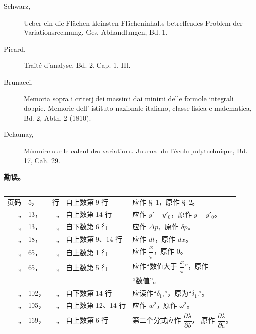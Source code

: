 \documentclass[11pt,a4paper,leqno]{article}
\begin{document}
\begin{description}
\item[Schwarz,] Ueber ein die Flächen kleinsten Flächeninhalts betreffendes
Problem der Variationsrechnung. Ges. Abhandlungen, Bd. 1.

\item[Picard,] Traité d'analyse, Bd. 2, Cap. 1, III.

\item[Brunacci,] Memoria sopra i criterj dei massimi dai minimi delle formole
integrali doppie. Memorie dell' istituto nazionale italiano, classe fisica e
matematica, Bd. 2, Abth. 2 (1810).

\item[Delaunay,] Mémoire sur le calcul des variations. Journal de l'école
polytechnique, Bd. 17, Cah. 29.
\end{description}

\begin{center}
{\Large\bfseries 勘误。}

\rule{1.8cm}{0.4pt}
\end{center}

{\small\noindent
\begin{tabularx}{\textwidth}{@{}r@{\ }l@{\ }r@{\ }l@{\ }X@{}}
页码 & 5，   & 行 & 自上数第 9 行       & 应作 \S~1，原作 \S~2。\\
„    & 13，  & „  & 自上数第 14 行      & 应作 $y'-y'_0$，原作 $y-y'_0$。\\
„    & 13，  & „  & 自下数第 6 行       & 应作 $\Delta p$，原作 $\delta p$。\\
„    & 18，  & „  & 自上数第 9、14 行   & 应作 $dt$，原作 $dx$。\\
„    & 65，  & „  & 自上数第 1 行       & 应作 $\dfrac{x}{\pi}$，原作 0。\\
„    & 65，  & „  & 自上数第 5 行       & 应作“数值大于 $\dfrac{x}{\pi}$”，原作\\
     &       &    &                     & “数值”。\\
„    & 102， & „  & 自下数第 14 行      & 应读作“$\delta_1$,”，原为“$\delta_1$.”。\\
„    & 105， & „  & 自上数第 12、14 行  & 应作 $w^2$，原作 $\omega^2$。\\
„    & 169， & „  & 自上数第 6 行       & 第二个分式应作 $\dfrac{\partial\lambda}{\partial b}$，
                                            原作 $\dfrac{\partial\lambda}{\partial a}$。\\
\end{tabularx}\par}
\end{document}
